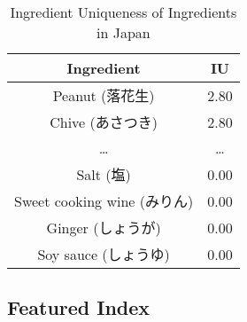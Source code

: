 \begin{CJK}{UTF8}{min}
\begin{table}
\centering
\caption{Ingredient Uniqueness of Ingredients in Japan}
\begin{tabular}{|c|c|}
\hline

\textbf{Ingredient} &	 \textbf{IU} \\ \hline
Peanut (落花生) 		&	2.80 \\ \hline
Chive (あさつき) 		&	2.80 \\ \hline
\ldots 		&\ldots  \\ \hline
Salt (塩)			&	0.00 \\ \hline
Sweet cooking wine (みりん)		&	0.00 \\ \hline
Ginger (しょうが)		& 	0.00 \\ \hline
Soy sauce (しょうゆ)		&	0.00\\ \hline
\end{tabular}

\label{tab:IU}
\end{table} 
\end{CJK}


\subsection{Featured Index}

